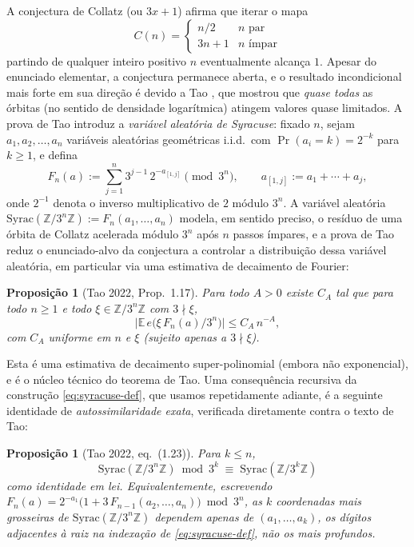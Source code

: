 \documentclass[11pt]{article}
\newtheorem{proposition}[theorem]{Proposição}
\theoremstyle{definition}
\theoremstyle{remark}
\begin{document}
A conjectura de Collatz (ou $3x+1$) afirma que iterar o mapa
\[
  C(n) = \begin{cases} n/2 & n \text{ par} \\ 3n+1 & n \text{ ímpar} \end{cases}
\]
partindo de qualquer inteiro positivo $n$ eventualmente alcança $1$.
Apesar do enunciado elementar, a conjectura permanece aberta, e o
resultado incondicional mais forte em sua direção é devido a Tao
\cite{Tao2022}, que mostrou que \emph{quase todas} as órbitas (no
sentido de densidade logarítmica) atingem valores quase limitados. A
prova de Tao introduz a \emph{variável aleatória de Syracuse}: fixado
$n$, sejam $a_1,a_2,\dots,a_n$ variáveis aleatórias geométricas i.i.d.\
com $\Pr(a_i=k)=2^{-k}$ para $k\ge 1$, e defina
\begin{equation}\label{eq:syracuse-def}
  F_n(a) := \sum_{j=1}^n 3^{j-1}\, 2^{-a_{[1,j]}} \pmod{3^n}, \qquad
  a_{[1,j]} := a_1+\cdots+a_j,
\end{equation}
onde $2^{-1}$ denota o inverso multiplicativo de $2$ módulo $3^n$. A
variável aleatória $\mathrm{Syrac}(\mathbb{Z}/3^n\mathbb{Z}) :=
F_n(a_1,\dots,a_n)$ modela, em sentido preciso, o resíduo de uma
órbita de Collatz acelerada módulo $3^n$ após $n$ passos ímpares, e a
prova de Tao reduz o enunciado-alvo da conjectura a controlar a
distribuição dessa variável aleatória, em particular via uma
estimativa de decaimento de Fourier:

\begin{proposition}[Tao 2022, Prop.~1.17]\label{prop:tao117}
Para todo $A>0$ existe $C_A$ tal que para todo $n\ge 1$ e todo
$\xi\in\mathbb{Z}/3^n\mathbb{Z}$ com $3\nmid \xi$,
\[
  \bigl|\mathbb{E}\, e\bigl(\xi\, F_n(a)/3^n\bigr)\bigr| \le C_A\, n^{-A},
\]
com $C_A$ uniforme em $n$ e $\xi$ (sujeito apenas a $3\nmid\xi$).
\end{proposition}

Esta é uma estimativa de decaimento super-polinomial (embora não
exponencial), e é o núcleo técnico do teorema de Tao. Uma consequência
recursiva da construção \eqref{eq:syracuse-def}, que usamos
repetidamente adiante, é a seguinte identidade de \emph{autossimilaridade
exata}, verificada diretamente contra o texto de Tao:

\begin{proposition}[Tao 2022, eq.~(1.23)]\label{prop:tao123}
Para $k\le n$,
\[
  \mathrm{Syrac}(\mathbb{Z}/3^n\mathbb{Z}) \bmod 3^k \; \equiv\;
  \mathrm{Syrac}(\mathbb{Z}/3^k\mathbb{Z})
\]
como identidade em lei. Equivalentemente, escrevendo $F_n(a) =
2^{-a_1}\bigl(1+3\,F_{n-1}(a_2,\dots,a_n)\bigr) \bmod 3^n$, as $k$
coordenadas mais grosseiras de $\mathrm{Syrac}(\mathbb{Z}/3^n\mathbb{Z})$
dependem apenas de $(a_1,\dots,a_k)$, os dígitos \emph{adjacentes à
raiz} na indexação de \eqref{eq:syracuse-def}, não os mais profundos.
\end{proposition}
\end{document}

